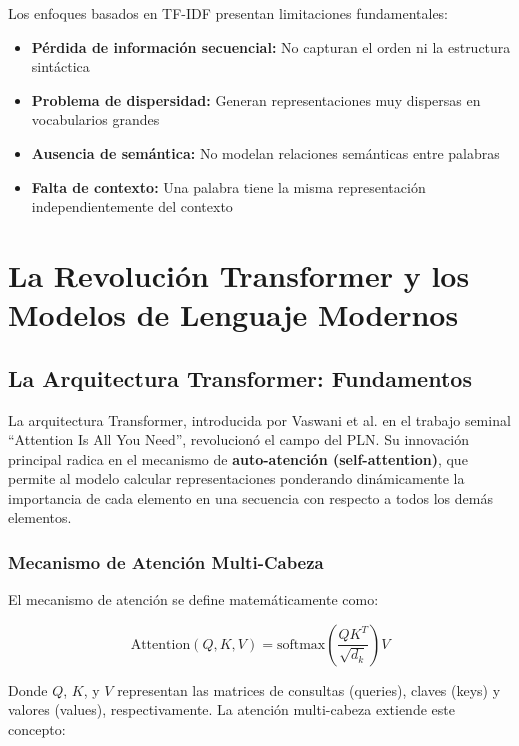 Los enfoques basados en TF-IDF presentan limitaciones fundamentales:
\begin{itemize}
    \item \textbf{Pérdida de información secuencial:} No capturan el orden ni la estructura sintáctica
    \item \textbf{Problema de dispersidad:} Generan representaciones muy dispersas en vocabularios grandes
    \item \textbf{Ausencia de semántica:} No modelan relaciones semánticas entre palabras
    \item \textbf{Falta de contexto:} Una palabra tiene la misma representación independientemente del contexto
\end{itemize}

\section{La Revolución Transformer y los Modelos de Lenguaje Modernos}
\label{sec:transformers_modelos_lenguaje}

\subsection{La Arquitectura Transformer: Fundamentos}

La arquitectura Transformer, introducida por Vaswani et al. \cite{vaswani2017attention} en el trabajo seminal ``Attention Is All You Need'', revolucionó el campo del PLN. Su innovación principal radica en el mecanismo de \textbf{auto-atención (self-attention)}, que permite al modelo calcular representaciones ponderando dinámicamente la importancia de cada elemento en una secuencia con respecto a todos los demás elementos.

\subsubsection{Mecanismo de Atención Multi-Cabeza}

El mecanismo de atención se define matemáticamente como:

\begin{equation}
\text{Attention}(Q,K,V) = \text{softmax}\left(\frac{QK^T}{\sqrt{d_k}}\right)V
\end{equation}

Donde $Q$, $K$, y $V$ representan las matrices de consultas (queries), claves (keys) y valores (values), respectivamente. La atención multi-cabeza extiende este concepto:


